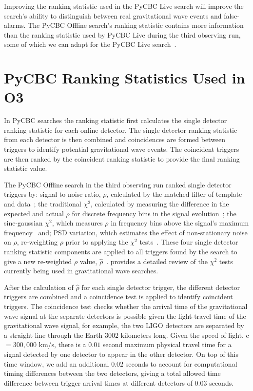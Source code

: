 Improving the ranking statistic used in the PyCBC Live search will improve the search's ability to distinguish between real gravitational wave events and false-alarms. The PyCBC Offline search's ranking statistic contains more information than the ranking statistic used by PyCBC Live during the third observing run, some of which we can adapt for the PyCBC Live search~\cite{PSD_var:2020, PyCBC:2017, PyCBC_global:2020}.

\section{\label{5:sec:previous-stat}PyCBC Ranking Statistics Used in O3}

In PyCBC searches the ranking statistic first calculates the single detector ranking statistic for each online detector. The single detector ranking statistic from each detector is then combined and coincidences are formed between triggers to identify potential gravitational wave events. The coincident triggers are then ranked by the coincident ranking statistic to provide the final ranking statistic value. 

The PyCBC Offline search in the third observing run ranked single detector triggers by: signal-to-noise ratio, $\rho$, calculated by the matched filter of template and data~\cite{FINDCHIRP:2012}; the traditional $\chi^{2}$, calculated by measuring the difference in the expected and actual $\rho$ for discrete frequency bins in the signal evolution~\cite{Allen_Chi:2005}; the sine-gaussian $\chi^{2}$, which measures $\rho$ in frequency bins above the signal's maximum frequency~\cite{PyCBC_sg:2018} and; PSD variation, which estimates the effect of non-stationary noise on $\rho$, re-weighting $\rho$ prior to applying the $\chi^{2}$ tests~\cite{PSD_var:2020}. These four single detector ranking statistic components are applied to all triggers found by the search to give a new re-weighted $\rho$ value, $\hat{\rho}$~\cite{rw_snr_eq:2012}. \cite{McIsaac_Chi:2022} provides a detailed review of the $\chi^{2}$ tests currently being used in gravitational wave searches.

After the calculation of $\hat{\rho}$ for each single detector trigger, the different detector triggers are combined and a coincidence test is applied to identify coincident triggers. The coincidence test checks whether the arrival time of the gravitational wave signal at the separate detectors is possible given the light-travel time of the gravitational wave signal, for example, the two LIGO detectors are separated by a straight line through the Earth $3002$ kilometers long. Given the speed of light, c $= 300,000$ km/s, there is a $0.01$ second maximum physical travel time for a signal detected by one detector to appear in the other detector. On top of this time window, we add an additional $0.02$ seconds to account for computational timing differences between the two detectors, giving a total allowed time difference between trigger arrival times at different detectors of $0.03$ seconds.

